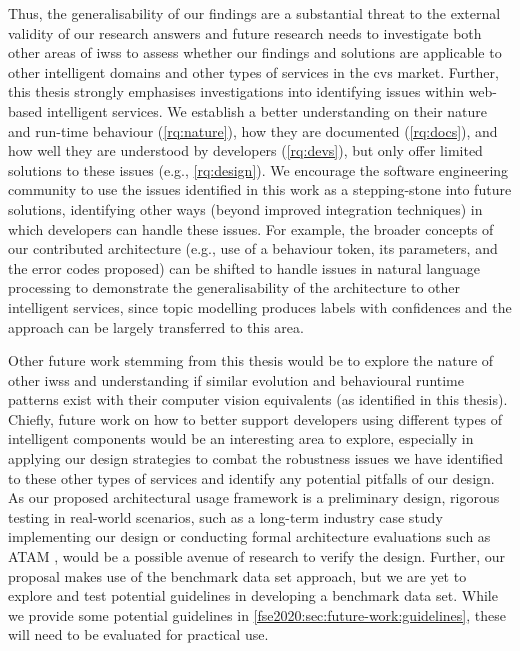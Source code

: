 Thus, the generalisability of our findings are a substantial threat to the external validity of our research answers and future research needs to investigate both other areas of \glspl{iws} to assess whether our findings and solutions are applicable to other intelligent domains and other types of services in the \gls{cvs} market. Further, this thesis strongly emphasises investigations into identifying issues within web-based intelligent services. We establish a better understanding on their nature and run-time behaviour  (\ref{rq:nature}), how they are documented (\ref{rq:docs}), and how well they are understood by developers (\ref{rq:devs}), but only offer limited solutions to these issues (e.g., \ref{rq:design}). We encourage the software engineering community to use the issues identified in this work as a stepping-stone into future solutions, identifying other ways (beyond improved integration techniques) in which developers can handle these issues. For example, the broader concepts of our contributed architecture (e.g., use of a behaviour token, its parameters, and the error codes proposed) can be shifted to handle issues in natural language processing to demonstrate the generalisability of the architecture to other intelligent services, since topic modelling produces labels with confidences and the approach can be largely transferred to this area.

Other future work stemming from this thesis would be to explore the nature of other \glspl{iws} and understanding if similar evolution and behavioural runtime patterns exist with their computer vision equivalents (as identified in this thesis). Chiefly, future work on how to better support developers using different types of intelligent components would be an interesting area to explore, especially in applying our design strategies to combat the robustness issues we have identified to these other types of services and identify any potential pitfalls of our design. As our proposed architectural usage framework is a preliminary design, rigorous testing in real-world scenarios, such as a long-term industry case study implementing our design or conducting formal architecture evaluations such as ATAM \citep{Kazman2000}, would be a possible avenue of research to verify the design. Further, our proposal makes use of the benchmark data set approach, but we are yet to explore and test potential guidelines in developing a benchmark data set. While we provide some potential guidelines in \cref{fse2020:sec:future-work:guidelines}, these will need to be evaluated for practical use.

